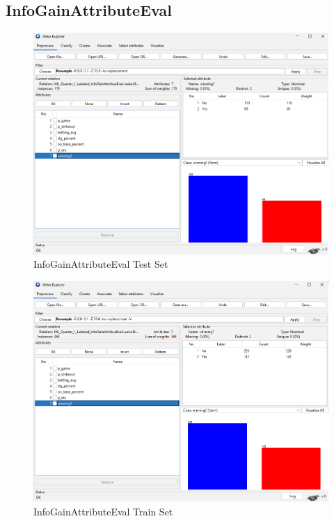 \documentclass[12pt]{article}
\begin{document}
\newpage
\subsection{InfoGainAttributeEval}
\begin{figure}[h!]
    \includegraphics[scale=0.4]{./images/InfoGainAttributeEval/TestSet.png}
\centering
    \caption{InfoGainAttributeEval Test Set}
    \label{fig:IGAETest}
\end{figure}
\begin{figure}[h!]
    \includegraphics[scale=0.4]{./images/InfoGainAttributeEval/TrainSet.png}
\centering
    \caption{InfoGainAttributeEval Train Set}
    \label{fig:IGAETrain}
\end{figure}
\end{document}
